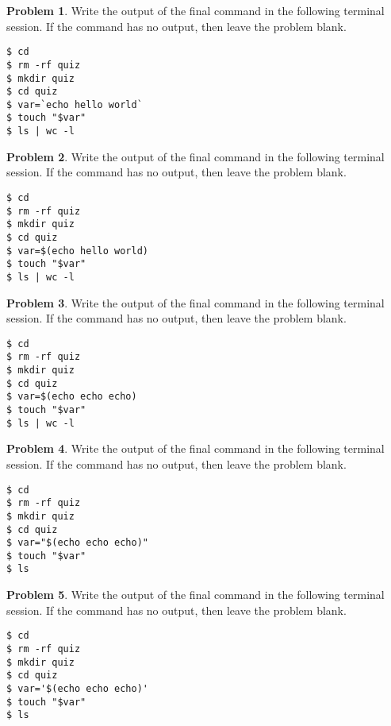 \documentclass[10pt]{article}
\theoremstyle{definition}
\newtheorem{problem}{Problem}
\begin{document}
\begin{problem}
    Write the output of the final command in the following terminal session.
    If the command has no output, then leave the problem blank.
\end{problem}
\begin{lstlisting}
$ cd
$ rm -rf quiz
$ mkdir quiz
$ cd quiz
$ var=`echo hello world`
$ touch "$var"
$ ls | wc -l
\end{lstlisting}
\vspace{0.4in}

\begin{problem}
    Write the output of the final command in the following terminal session.
    If the command has no output, then leave the problem blank.
\end{problem}
\begin{lstlisting}
$ cd
$ rm -rf quiz
$ mkdir quiz
$ cd quiz
$ var=$(echo hello world)
$ touch "$var"
$ ls | wc -l
\end{lstlisting}
\vspace{0.4in}

\begin{problem}
    Write the output of the final command in the following terminal session.
    If the command has no output, then leave the problem blank.
\end{problem}
\begin{lstlisting}
$ cd
$ rm -rf quiz
$ mkdir quiz
$ cd quiz
$ var=$(echo echo echo)
$ touch "$var"
$ ls | wc -l
\end{lstlisting}
\vspace{0.4in}


\begin{problem}
    Write the output of the final command in the following terminal session.
    If the command has no output, then leave the problem blank.
\end{problem}
\begin{lstlisting}
$ cd
$ rm -rf quiz
$ mkdir quiz
$ cd quiz
$ var="$(echo echo echo)"
$ touch "$var"
$ ls
\end{lstlisting}
\vspace{0.4in}

\begin{problem}
    Write the output of the final command in the following terminal session.
    If the command has no output, then leave the problem blank.
\end{problem}
\begin{lstlisting}
$ cd
$ rm -rf quiz
$ mkdir quiz
$ cd quiz
$ var='$(echo echo echo)'
$ touch "$var"
$ ls
\end{lstlisting}
\vspace{0.4in}
\end{document}
